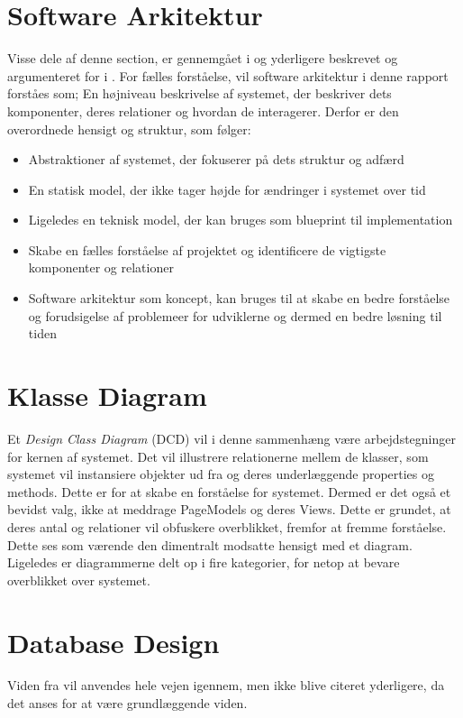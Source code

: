 \section{Software Arkitektur}
\label{sec:software-arkitektur}
Visse dele af denne section, er gennemgået i  og yderligere beskrevet og argumenteret for i . 
For fælles forståelse, vil software arkitektur i denne rapport forståes som; En højniveau beskrivelse af systemet, der beskriver dets komponenter, deres relationer og hvordan de interagerer. Derfor er den overordnede hensigt og struktur, som følger:
\begin{itemize}
    \item Abstraktioner af systemet, der fokuserer på dets struktur og adfærd
    \item En statisk model, der ikke tager højde for ændringer i systemet over tid
    \item Ligeledes en teknisk model, der kan bruges som blueprint til implementation
    \item Skabe en fælles forståelse af projektet og identificere de vigtigste komponenter og relationer
    \item Software arkitektur som koncept, kan bruges til at skabe en bedre forståelse og forudsigelse af problemeer for udviklerne og dermed en bedre løsning til tiden
\end{itemize}

\section{Klasse Diagram}
\label{sec:class-diagram}
Et \emph{Design Class Diagram} (DCD) vil i denne sammenhæng være arbejdstegninger for kernen af systemet. Det vil illustrere relationerne mellem de klasser, som systemet vil instansiere objekter ud fra og deres underlæggende properties og methods. 
Dette er for at skabe en forståelse for systemet. Dermed er det også et bevidst valg, ikke at meddrage PageModels og deres Views. Dette er grundet, at deres antal og relationer vil obfuskere overblikket, fremfor at fremme forståelse. 
Dette ses som værende den dimentralt modsatte hensigt med et diagram. Ligeledes er diagrammerne delt op i fire kategorier, for netop at bevare overblikket over systemet.

\section{Database Design}
\label{sec:database-design}
Viden fra \cite{connolly2023database} vil anvendes hele vejen igennem, men ikke blive citeret yderligere, da det anses for at være grundlæggende viden.

